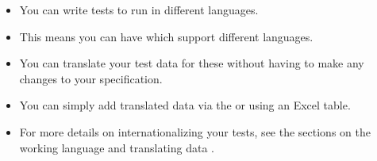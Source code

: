 
\label{tasksinternat}
\begin{itemize}
\item You can write tests to run in different languages.
\item This means you can have \gdauts{} which support different languages.
\item You can translate your test data for these \gdauts{} without having to make any changes to your specification.
\item You can simply add translated data via the \gddatasetsview{} or using an Excel table.
\item For more details on internationalizing your tests, see the sections on the working language  and translating data . 
\end{itemize}
